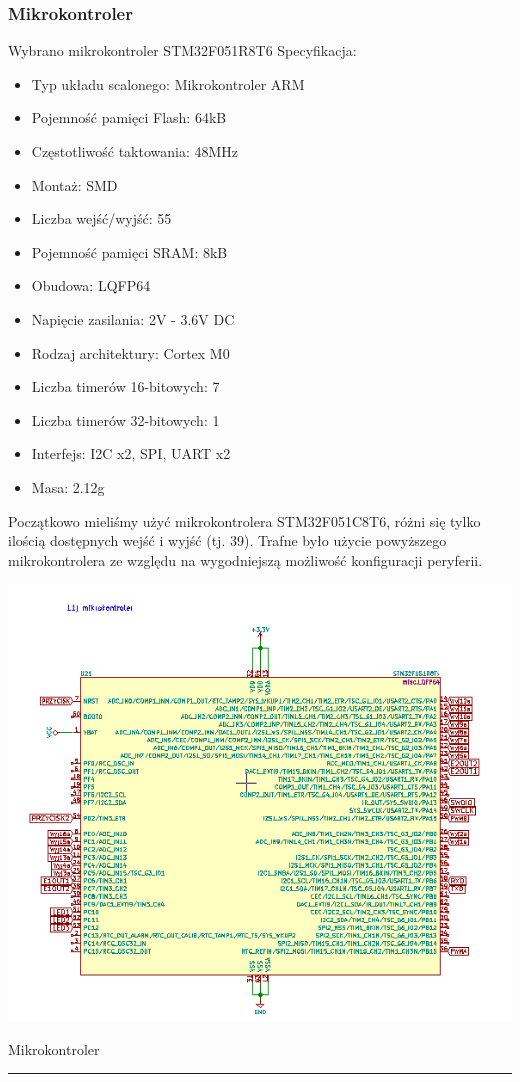 \documentclass[12pt,a4paper]{article}
\begin{document}
\subsubsection{Mikrokontroler}

Wybrano mikrokontroler STM32F051R8T6
\newline Specyfikacja:
\begin{itemize}
\item Typ układu scalonego: Mikrokontroler ARM
\item Pojemność pamięci Flash: 64kB
\item Częstotliwość taktowania: 48MHz
\item Montaż: SMD
\item Liczba wejść/wyjść: 55
\item Pojemność pamięci SRAM: 8kB
\item Obudowa: LQFP64
\item Napięcie zasilania: 2V - 3.6V DC
\item Rodzaj architektury: Cortex M0
\item Liczba timerów 16-bitowych: 7
\item Liczba timerów 32-bitowych: 1
\item Interfejs: I2C x2, SPI, UART x2
\item Masa: 2.12g
\end{itemize}

Początkowo mieliśmy użyć mikrokontrolera STM32F051C8T6, różni się tylko ilością dostępnych wejść i wyjść (tj. 39). Trafne było użycie powyższego mikrokontrolera ze względu na wygodniejszą możliwość konfiguracji peryferii.	 

\begin{center}
\includegraphics[scale=0.7]{mikroklocek1.png}
\caption{Mikrokontroler}
\vspace*{1cm}
\noindent \rule{\linewidth}{0.4mm}
\end{center}
\end{document}
